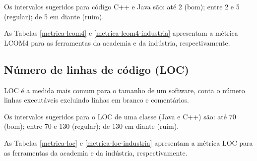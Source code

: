 Os intervalos sugeridos para código C++ e Java são: até 2 (bom); entre 2 e 5
(regular); de 5 em diante (ruim).

As Tabelas \ref{metrica-lcom4} e \ref{metrica-lcom4-industria} apresentam a
métrica LCOM4 para as ferramentas da academia e da indústria, respectivamente.



\subsection{Número de linhas de código (LOC)}

LOC é a medida mais comum para o tamanho de um software, conta o número linhas
executáveis excluindo linhas em branco e comentários.

Os intervalos sugeridos para o LOC de uma classe (Java e C++) são: até 70
(bom); entre 70 e 130 (regular); de 130 em diante (ruim).

As Tabelas \ref{metrica-loc} e \ref{metrica-loc-industria} apresentam a
métrica LOC para as ferramentas da academia e da indústria, respectivamente.



